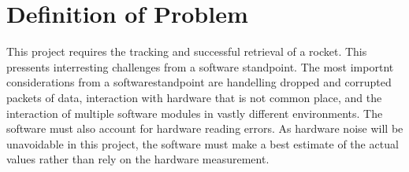 \documentclass[onecolumn, draftclsnofoot,10pt, compsoc]{IEEEtran}
\begin{document}
\begin{titlepage}
\begin{singlespace}
\begin{abstract}
        \end{abstract}     
    \end{singlespace}
\end{titlepage}
\newpage
{}
\tableofcontents
\clearpage

\section{Definition of Problem}
This project requires the tracking and successful retrieval of a rocket. This pressents interresting challenges from a software standpoint. The most importnt considerations from a softwarestandpoint are handelling dropped and corrupted packets of data, interaction with hardware that is not common place, and the interaction of multiple software modules in vastly different environments. The software must also account for hardware reading errors. As hardware noise will be unavoidable in this project, the software must make a best estimate of the actual values rather than rely on the hardware measurement.\par
\end{document}
